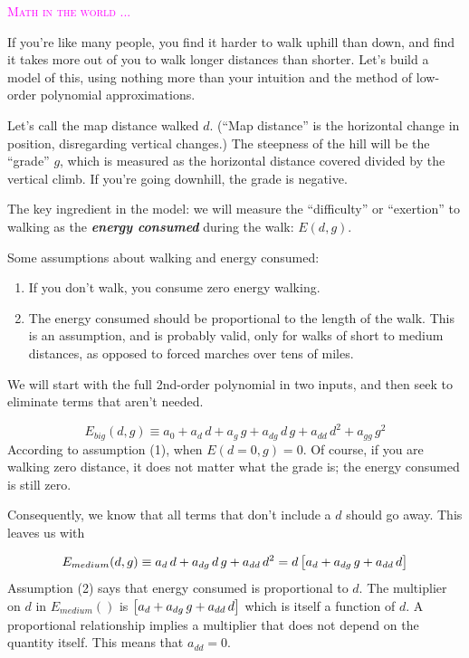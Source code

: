 \documentclass[
  letterpaper,
  DIV=11,
  numbers=noendperiod,
  oneside]{scrreprt}
\providecommand{\tightlist}{%
  \setlength{\itemsep}{0pt}\setlength{\parskip}{0pt}}
\newenvironment{intheworld}%
{%
\textcolor{magenta}{\hrulefill}%
  \par\vspace{.3\baselineskip}%
  \textcolor{magenta}{\scshape Math in the world ...}%
  \par\vspace{\baselineskip}%
}%
{\textcolor{magenta}{\hrulefill}}
\begin{document}
\begin{intheworld}
If you're like many people, you find it harder to walk uphill than down,
and find it takes more out of you to walk longer distances than shorter.
Let's build a model of this, using nothing more than your intuition and
the method of low-order polynomial approximations.

Let's call the map distance walked \(d\). (``Map distance'' is the
horizontal change in position, disregarding vertical changes.) The
steepness of the hill will be the ``grade'' \(g\), which is measured as
the horizontal distance covered divided by the vertical climb. If you're
going downhill, the grade is negative.

The key ingredient in the model: we will measure the ``difficulty'' or
``exertion'' to walking as the \textbf{\emph{energy consumed}} during
the walk: \(E(d, g)\).

Some assumptions about walking and energy consumed:

\begin{enumerate}
\def\labelenumi{\arabic{enumi}.}
\tightlist
\item
  If you don't walk, you consume zero energy walking.
\item
  The energy consumed should be proportional to the length of the walk.
  This is an assumption, and is probably valid, only for walks of short
  to medium distances, as opposed to forced marches over tens of miles.
\end{enumerate}

We will start with the full 2nd-order polynomial in two inputs, and then
seek to eliminate terms that aren't needed.

\[E_{big}(d, g) \equiv a_0 + a_d\, d + a_g\, g + a_{dg}\, d\, g + a_{dd}\,d^2 + a_{gg}\,g^2\]
According to assumption (1), when \(E(d=0, g) = 0\). Of course, if you
are walking zero distance, it does not matter what the grade is; the
energy consumed is still zero.

Consequently, we know that all terms that don't include a \(d\) should
go away. This leaves us with

\[E_{medium}(d, g) \equiv  a_d\, d + a_{dg}\, d\, g + a_{dd}\,d^2 = d \left[\strut a_d + a_{dg}\, g + a_{dd}\,d\right]\]
Assumption (2) says that energy consumed is proportional to \(d\). The
multiplier on \(d\) in \(E_{medium}()\) is
\(\left[\strut a_d + a_{dg}\, g + a_{dd}\,d\right]\) which is itself a
function of \(d\). A proportional relationship implies a multiplier that
does not depend on the quantity itself. This means that \(a_{dd} = 0\).


\end{intheworld}
\end{document}
